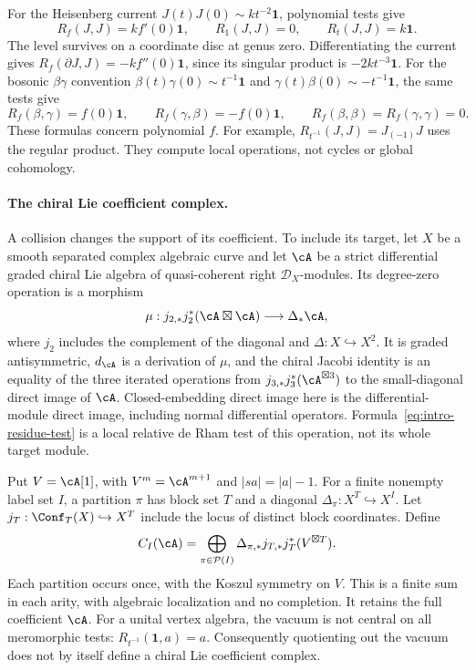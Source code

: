 For the Heisenberg current $J(t)J(0)\sim k t^{-2}\mathbf1$,
polynomial tests give
\[
 R_f(J,J)=k f'(0)\mathbf1,\qquad
 R_1(J,J)=0,\qquad R_t(J,J)=k\mathbf1.
\]
The level survives on a coordinate disc at genus zero. Differentiating
the current gives $R_f(\partial J,J)=-k f''(0)\mathbf1$,
since its singular product is $-2k t^{-3}\mathbf1$.
For the bosonic $\beta\gamma$ convention
$\beta(t)\gamma(0)\sim t^{-1}\mathbf1$ and
$\gamma(t)\beta(0)\sim-t^{-1}\mathbf1$, the same tests give
\[
 R_f(\beta,\gamma)=f(0)\mathbf1,\qquad
 R_f(\gamma,\beta)=-f(0)\mathbf1,
 \qquad R_f(\beta,\beta)=R_f(\gamma,\gamma)=0.
\]
These formulas concern polynomial $f$. For example,
$R_{t^{-1}}(J,J)=J_{(-1)}J$ uses the regular product.
They compute local operations, not cycles or global cohomology.

\paragraph{The chiral Lie coefficient complex.}
A collision changes the support of its coefficient. To include
its target, let $X$ be a smooth separated complex algebraic curve
and let $\cA$ be a strict differential graded chiral Lie algebra
of quasi-coherent right $\mathcal D_X$-modules. Its degree-zero
operation is a morphism
\[
 \mu:j_{2,*}j_2^*(\cA\boxtimes\cA)\longrightarrow\Delta_*\cA,
\]
where $j_2$ includes the complement of the diagonal and
$\Delta:X\hookrightarrow X^2$. It is graded antisymmetric,
$d_{\cA}$ is a derivation of $\mu$, and the chiral Jacobi
identity is an equality of the three iterated operations from
$j_{3,*}j_3^*(\cA^{\boxtimes3})$ to the small-diagonal
direct image of $\cA$. Closed-embedding direct image here is
the differential-module direct image, including normal differential
operators. Formula~\eqref{eq:intro-residue-test} is a local relative
de Rham test of this operation, not its whole target module.

Put $V=\cA[1]$, with $V^m=\cA^{m+1}$ and $|sa|=|a|-1$.
For a finite nonempty label set $I$, a partition $\pi$ has block
set $T$ and a diagonal $\Delta_\pi:X^T\hookrightarrow X^I$.
Let $j_T:\Conf_T(X)\hookrightarrow X^T$ include the locus
of distinct block coordinates. Define
\begin{equation}\label{eq:intro-chiral-lie-carrier}
 C_I(\cA)=\bigoplus_{\pi\in\mathcal P(I)}
          \Delta_{\pi,*}j_{T,*}j_T^*(V^{\boxtimes T}).
\end{equation}
Each partition occurs once, with the Koszul symmetry on $V$.
This is a finite sum in each arity, with algebraic localization
and no completion. It retains the full coefficient $\cA$.
For a unital vertex algebra, the vacuum is not central on all
meromorphic tests: $R_{t^{-1}}(\mathbf1,a)=a$.
Consequently quotienting out the vacuum does not by itself define
a chiral Lie coefficient complex.


